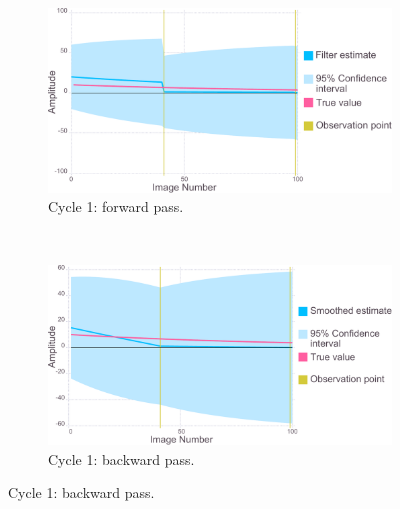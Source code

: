 \begin{figure}
    \ContinuedFloat
    \begin{subfigure}[b]{1.0\textwidth}
        \centering
        \includegraphics[width=\textwidth]{figures/datared/intDecSim_Filt1_bad.pdf}
        \caption{Cycle 1: forward pass.}
        \label{fig:UKF simulation results - cycle 1 - bad}
    \end{subfigure}
    \\
    \begin{subfigure}[b]{1.0\textwidth}
        \centering
        \includegraphics[width=\textwidth]{figures/datared/intDecSim1_bad.pdf}
        \caption{Cycle 1: backward pass.}
        \label{fig:URTSS simulation results - cycle 1 - bad}
    \end{subfigure}
\end{figure}
